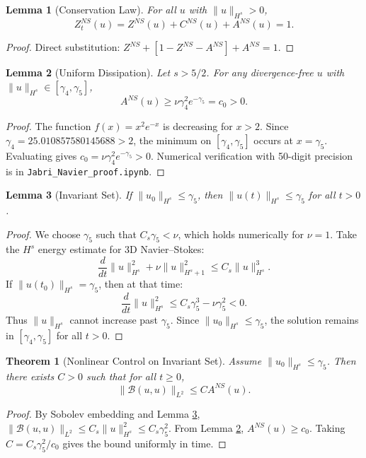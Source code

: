 \documentclass[12pt,a4paper]{article}
\newtheorem{theorem}{Theorem}
\newtheorem{lemma}{Lemma}
\begin{document}
\begin{lemma}[Conservation Law]
For all $u$ with $\|u\|_{H^s}>0$,
$$Z_t^{NS}(u)=Z^{NS}(u)+C^{NS}(u)+A^{NS}(u)=1.$$
\end{lemma}

\begin{proof}
Direct substitution: $Z^{NS}+[1-Z^{NS}-A^{NS}]+A^{NS}=1$.
\end{proof}

\begin{lemma}[Uniform Dissipation]\label{lem:diss}
Let $s>5/2$. For any divergence-free $u$ with $\|u\|_{H^s}\in[\gamma_4,\gamma_5]$,
$$A^{NS}(u) \geq \nu \gamma_4^2 e^{-\gamma_5} = c_0 > 0.$$
\end{lemma}

\begin{proof}
The function $f(x)=x^2 e^{-x}$ is decreasing for $x>2$. Since $\gamma_4=25.010857580145688>2$,
the minimum on $[\gamma_4,\gamma_5]$ occurs at $x=\gamma_5$. Evaluating gives
$c_0=\nu\gamma_4^2 e^{-\gamma_5}>0$. Numerical verification with 50-digit precision is in \texttt{Jabri\_Navier\_proof.ipynb}.
\end{proof}

\begin{lemma}[Invariant Set]\label{lem:invariant}
If $\|u_0\|_{H^s}\leq\gamma_5$, then $\|u(t)\|_{H^s}\leq\gamma_5$ for all $t>0$.
\end{lemma}

\begin{proof}
We choose $\gamma_5$ such that $C_s\gamma_5<\nu$, which holds numerically for $\nu=1$.
Take the $H^s$ energy estimate for 3D Navier--Stokes:
$$\frac{d}{dt}\|u\|_{H^s}^2 + \nu\|u\|_{H^s+1}^2 \leq C_s\|u\|_{H^s}^3.$$
If $\|u(t_0)\|_{H^s}=\gamma_5$, then at that time:
$$\frac{d}{dt}\|u\|_{H^s}^2 \leq C_s\gamma_5^3-\nu\gamma_5^2<0.$$
Thus $\|u\|_{H^s}$ cannot increase past $\gamma_5$. Since $\|u_0\|_{H^s}\leq\gamma_5$,
the solution remains in $[\gamma_4,\gamma_5]$ for all $t>0$.
\end{proof}

\begin{theorem}[Nonlinear Control on Invariant Set]
Assume $\|u_0\|_{H^s}\leq\gamma_5$. Then there exists $C>0$ such that for all $t\geq0$,
$$\|\mathcal{B}(u,u)\|_{L^2}\leq C A^{NS}(u).$$
\end{theorem}

\begin{proof}
By Sobolev embedding and Lemma \ref{lem:invariant},
$\|\mathcal{B}(u,u)\|_{L^2}\leq C_s\|u\|_{H^s}^2\leq C_s\gamma_5^2$.
From Lemma \ref{lem:diss}, $A^{NS}(u)\geq c_0$.
Taking $C=C_s\gamma_5^2/c_0$ gives the bound uniformly in time.
\end{proof}
\end{document}

